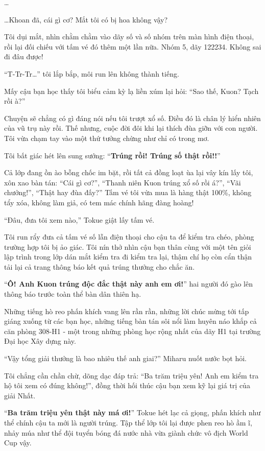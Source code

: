 \documentclass[../main.tex]{subfiles}
\begin{document}
\dots

\dots Khoan đã, cái gì cơ? Mắt tôi có bị hoa không vậy?

Tôi dụi mắt, nhìn chằm chằm vào dãy số và số nhóm trên màn hình điện thoại, rồi lại đối chiếu với tấm vé đó thêm một lần nữa. Nhóm 5, dãy 122234. Không sai đi đâu được!

``T-Tr-Tr\dots'' tôi lắp bắp, môi run lên không thành tiếng.

Mấy cậu bạn học thấy tôi biểu cảm kỳ lạ liền xúm lại hỏi: ``Sao thế, Kuon? Tạch rồi à?''

Chuyện sẽ chẳng có gì đáng nói nếu tôi trượt xổ số. Điều đó là chân lý hiển nhiên của vũ trụ này rồi. Thế nhưng, cuộc đời đôi khi lại thích đùa giỡn với con người. Tôi vừa chạm tay vào một thứ tưởng chừng như chỉ có trong mơ.

Tôi bất giác hét lên sung sướng: ``\textbf{Trúng rồi! Trúng số thật rồi!!}''

Cả lớp đang ồn ào bỗng chốc im bặt, rồi tất cả đồng loạt ùa lại vây kín lấy tôi, xôn xao bàn tán: ``Cái gì cơ?'', ``Thanh niên Kuon trúng xổ số rồi á?'', ``Vãi chưởng!'', ``Thật hay đùa đấy?'' Tấm vé tôi vừa mua là hàng thật 100\%, không tẩy xóa, không làm giả, có tem mác chính hãng đàng hoàng!

``Đâu, đưa tôi xem nào,'' Tokue giật lấy tấm vé.

Tôi run rẩy đưa cả tấm vé số lẫn điện thoại cho cậu ta để kiểm tra chéo, phòng trường hợp tôi bị ảo giác. Tôi nín thở nhìn cậu bạn thân cùng với một tên giỏi lập trình trong lớp dán mắt kiểm tra đi kiểm tra lại, thậm chí họ còn cẩn thận tải lại cả trang thông báo kết quả trúng thưởng cho chắc ăn.

``\textbf{Ô! Anh Kuon trúng độc đắc thật này anh em ơi!}'' hai người đó gào lên thông báo trước toàn thể bàn dân thiên hạ.

Những tiếng hò reo phấn khích vang lên rần rần, những lời chúc mừng tới tấp giáng xuống từ các bạn học, những tiếng bàn tán sôi nổi làm huyên náo khắp cả căn phòng 308-H1 - một trong những phòng học rộng nhất của dãy H1 tại trường Đại học Xây dựng này.

``Vậy tổng giải thưởng là bao nhiêu thế anh giai?'' Miharu nuốt nước bọt hỏi.

Tôi chẳng cần chần chừ, dõng dạc đáp trả: ``Ba trăm triệu yên! Anh em kiểm tra hộ tôi xem có đúng không!'', đồng thời hối thúc cậu bạn xem kỹ lại giá trị của giải Nhất.

``\textbf{Ba trăm triệu yên thật này má ơi!}'' Tokue hét lạc cả giọng, phấn khích như thể chính cậu ta mới là người trúng. Tập thể lớp tôi lại được phen reo hò ầm ĩ, nhảy múa như thể đội tuyển bóng đá nước nhà vừa giành chức vô địch World Cup vậy.
\end{document}
